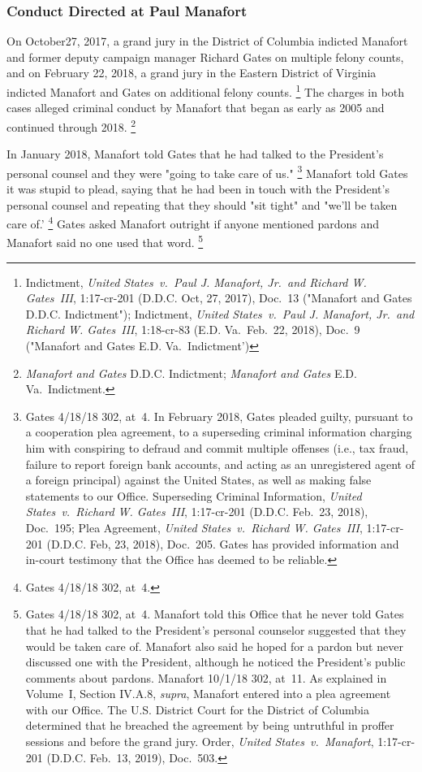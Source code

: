 {\subsubsection{Conduct Directed at Paul Manafort}

On October27, 2017, a grand jury in the District of Columbia indicted Manafort and former deputy campaign manager Richard Gates on multiple felony counts, and on February 22, 2018, a grand jury in the Eastern District of Virginia indicted Manafort and Gates on additional felony counts.%
\footnote{Indictment, \textit{United States~v.\ Paul J. Manafort, Jr.\ and Richard W. Gates~III}, 1:17-cr-201 (D.D.C. Oct, 27, 2017), Doc.~13 ("Manafort and Gates D.D.C. Indictment");
Indictment, \textit{United States~v.\ Paul J. Manafort, Jr.\ and Richard W. Gates~III}, 1:18-cr-83 (E.D. Va.\ Feb.~22, 2018), Doc.~9 ("Manafort and Gates E.D. Va.\ Indictment')}
The charges in both cases alleged criminal conduct by Manafort that began as early as 2005 and continued through 2018.%
\footnote{\textit{Manafort and Gates} D.D.C. Indictment; \textit{Manafort and Gates} E.D. Va.\ Indictment.}

In January 2018, Manafort told Gates that he had talked to the President's personal counsel and they were "going to take care of us."%
\footnote{Gates 4/18/18 302, at~4.
In February 2018, Gates pleaded guilty, pursuant to a cooperation plea agreement, to a superseding criminal information charging him with conspiring to defraud and commit multiple offenses (i.e., tax fraud, failure to report foreign bank accounts, and acting as an unregistered agent of a foreign principal) against the United States, as well as making false statements to our Office.
Superseding Criminal Information, \textit{United States~v.\ Richard W. Gates~III}, 1:17-cr-201 (D.D.C. Feb.~23, 2018), Doc.~195;
Plea Agreement, \textit{United States~v.\ Richard W. Gates~III}, 1:17-cr-201 (D.D.C. Feb, 23, 2018), Doc.~205.
Gates has provided information and in-court testimony that the Office has deemed to be reliable.}
Manafort told Gates it was stupid to plead, saying that he had been in touch with the President's personal counsel and repeating that they should "sit tight" and "we'll be taken care of.'%
\footnote{Gates 4/18/18 302, at~4.}
Gates asked Manafort outright if anyone mentioned pardons and Manafort said no one used that word.%
\footnote{Gates 4/18/18 302, at~4.
Manafort told this Office that he never told Gates that he had talked to the President's personal counselor suggested that they would be taken care of.
Manafort also said he hoped for a pardon but never discussed one with the President, although he noticed the President's public comments about pardons.
Manafort 10/1/18 302, at~11.
As explained in Volume~I, Section IV.A.8, \textit{supra}, Manafort entered into a plea agreement with our Office.
The U.S. District Court for the District of Columbia determined that he breached the agreement by being untruthful in proffer sessions and before the grand jury.
Order, \textit{United States~v.\ Manafort}, 1:17-cr-201 (D.D.C. Feb.~13, 2019), Doc.~503.}

}
